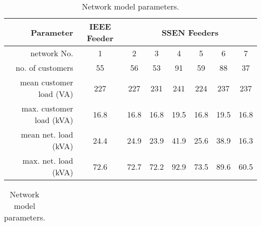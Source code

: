 \begin{table}\centering
\begin{tabular}{r | c | c c c c c c}
Parameter & IEEE Feeder & \multicolumn{6}{c}{SSEN Feeders}\\
\hline
network No. & 1 & 2 & 3 & 4 & 5 & 6 & 7\\
\hline
no. of customers & 55 & 56 & 53 & 91 & 59 & 88 & 37\\
mean customer load (VA) & 227 & 227 & 231 & 241 & 224 & 237 & 237\\
max. customer load (kVA)& 16.8 & 16.8 & 16.8 & 19.5 & 16.8 & 19.5 & 16.8\\
mean net. load (kVA)& 24.4 & 24.9 & 23.9 & 41.9 & 25.6 & 38.9 & 16.3\\
max. net. load (kVA)& 72.6 & 72.7 & 72.2 & 92.9 & 73.5 & 89.6 & 60.5\\ 
\end{tabular}
\caption{Network model parameters.}
\label{ch4:tab:model-parameters}
\begin{tabular}{ccc}
\end{tabular}
\end{table}